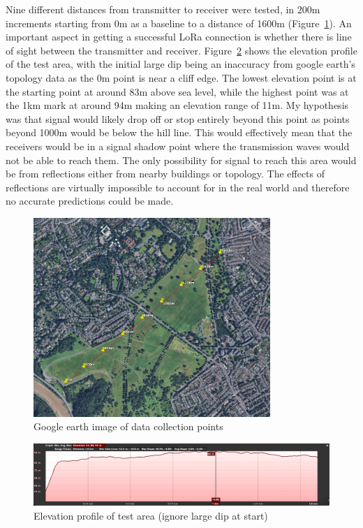 Nine different distances from transmitter to receiver were tested, in 200m
increments starting from 0m as a baseline to a distance of 1600m
(Figure~\ref{fig:range-test-markers}). An important aspect in getting a
successful LoRa connection is whether there is line of sight between the
transmitter and receiver. Figure~\ref{fig:range-test-elevation} shows the
elevation profile of the test area, with the initial large dip being an
inaccuracy from google earth's topology data as the 0m point is near a cliff
edge. The lowest elevation point is at the starting point at around 83m above
sea level, while the highest point was at the 1km mark at around 94m making an
elevation range of 11m. My hypothesis was that signal would likely drop off or
stop entirely beyond this point as points beyond 1000m would be below the hill
line. This would effectively mean that the receivers would be in a signal shadow
point where the transmission waves would not be able to reach them. The only
possibility for signal to reach this area would be from reflections either from
nearby buildings or topology. The effects of reflections are virtually
impossible to account for in the real world and therefore no accurate
predictions could be made.

\begin{figure}[H]
    \centering
    \includegraphics[width=0.8\textwidth]{contents/part-2/fig2/range-test-markers.jpg}
    \caption{Google earth image of data collection points}
    \label{fig:range-test-markers}
\end{figure}


\begin{figure}[H]
    \centering
    \includegraphics[width=1\textwidth]{contents/part-2/fig2/range-test-elevation-profile.jpg}
    \caption{Elevation profile of test area (ignore large dip at start)}
    \label{fig:range-test-elevation}
\end{figure}

